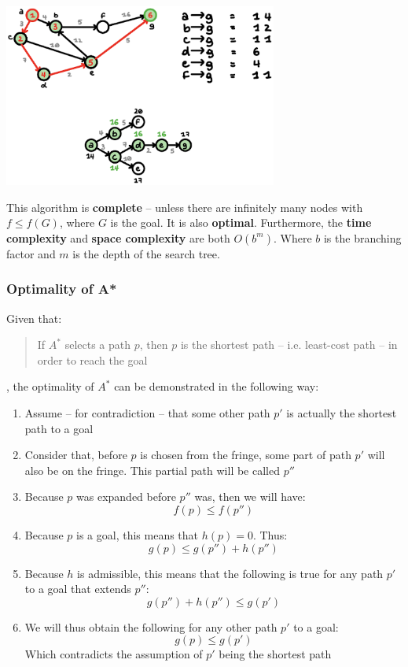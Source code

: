 \documentclass{article}
\begin{document}
\begin{center}
	\includegraphics[width=9cm]{a*.png}
\end{center}
\vspace{.3cm}
This algorithm is \textbf{complete} -- unless there are infinitely many nodes with $f \leq f(G)$, where $G$ is the goal. It is also \textbf{optimal}. Furthermore, the \textbf{time complexity} and \textbf{space complexity} are both $O(b^m)$. Where $b$ is the branching factor and $m$ is the depth of the search tree.

\subsubsection{Optimality of A*}
Given that: \blockquote{If $A^*$ selects a path $p$, then $p$ is the shortest path -- i.e. least-cost path -- in order to reach the goal}, the optimality of $A^*$ can be demonstrated in the following way:

\begin{enumerate}
	\item Assume -- for contradiction -- that some other path $p'$ is actually the shortest path to a goal
	\item Consider that, before $p$ is chosen from the fringe, some part of path $p'$ will also be on the fringe. This partial path will be called $p''$
	\item Because $p$ was expanded before $p''$ was, then we will have:
	\[ f(p) \leq f(p'') \]
	\item Because $p$ is a goal, this means that $h(p) = 0$. Thus:
	\[ g(p) \leq g(p'') + h(p'') \]
	\item Because $h$ is admissible, this means that the following is true for any path $p'$ to a goal that extends $p''$:
	\[ g(p'') + h(p'') \leq g(p') \]
	\item We will thus obtain the following for any other path $p'$ to a goal:
	\[ g(p) \leq g(p') \]
	Which contradicts the assumption of $p'$ being the shortest path
\end{enumerate}
\end{document}
